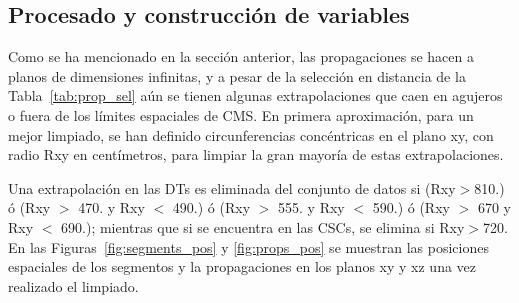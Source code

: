\subsection{Procesado y construcci\'on de variables}\label{sec:procesado}

Como se ha mencionado en la secci\'on anterior, las propagaciones se hacen a planos de dimensiones infinitas, y a pesar de la selecci\'on en distancia de la Tabla~\ref{tab:prop_sel} a\'un se tienen algunas extrapolaciones que caen en agujeros o fuera de los l\'imites espaciales de CMS. En primera aproximaci\'on, para un mejor limpiado, se han definido circunferencias conc\'entricas en el plano xy, con radio Rxy en cent\'imetros, para limpiar la gran mayor\'ia de estas extrapolaciones. 

Una extrapolaci\'on en las DTs es eliminada del conjunto de datos si (Rxy$>$810.) \'o (Rxy $>$ 470. y Rxy $<$ 490.) \'o (Rxy $>$ 555. y  Rxy $<$ 590.) \'o (Rxy $>$ 670 y Rxy $<$ 690.); mientras que si se encuentra en las CSCs, se elimina si Rxy$>$720. En las Figuras~\ref{fig:segments_pos} y \ref{fig:props_pos} se muestran las posiciones espaciales de los segmentos y la propagaciones en los planos xy y xz una vez realizado el limpiado. \\


